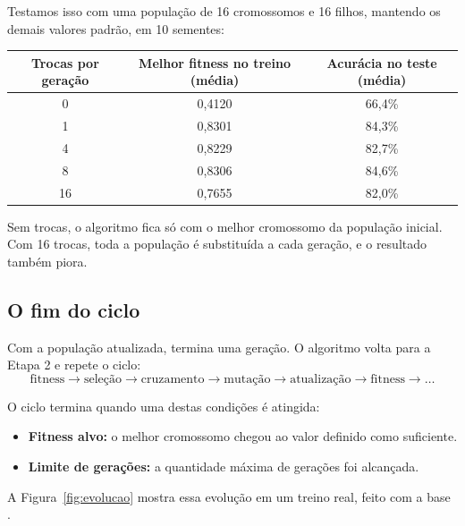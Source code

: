 \documentclass[11pt,a4paper]{article}
\newcommand{\code}[1]{\texttt{\detokenize{#1}}}
\newenvironment{tabela}{\par\nopagebreak[4]\vspace{0.3em}\nopagebreak[4]\begingroup\centering\small}{\par\endgroup\vspace{0.6em}}
\begin{document}
Testamos isso com uma população de 16 cromossomos e 16 filhos, mantendo os demais valores padrão, em 10 sementes:

\begin{tabela}
\begin{tabular}{ccc}
\toprule
Trocas por geração & Melhor fitness no treino (média) & Acurácia no teste (média)\\
\midrule
0 & 0,4120 & 66,4\%\\
1 & 0,8301 & 84,3\%\\
4 & 0,8229 & 82,7\%\\
8 & 0,8306 & 84,6\%\\
16 & 0,7655 & 82,0\%\\
\bottomrule
\end{tabular}
\end{tabela}

Sem trocas, o algoritmo fica só com o melhor cromossomo da população inicial. Com 16 trocas, toda a população é substituída a cada geração, e o resultado também piora.

\subsection{O fim do ciclo}

Com a população atualizada, termina uma geração. O algoritmo volta para a Etapa 2 e repete o ciclo:
\[
  \text{fitness} \to \text{seleção} \to \text{cruzamento} \to \text{mutação} \to \text{atualização} \to \text{fitness} \to \dots
\]

O ciclo termina quando uma destas condições é atingida:
\begin{itemize}
  \item \textbf{Fitness alvo:} o melhor cromossomo chegou ao valor definido como suficiente.
  \item \textbf{Limite de gerações:} a quantidade máxima de gerações foi alcançada.
\end{itemize}

A Figura~\ref{fig:evolucao} mostra essa evolução em um treino real, feito com a base \code{dados_binario_1.xlsx}.
\end{document}
